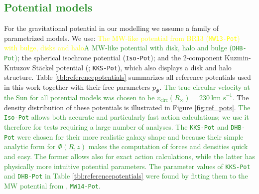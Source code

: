 \documentclass[iop,revtex4,numberedappendix,appendixfloats]{emulateapj}
\newcommand{\NEW}[1]{\textcolor{ForestGreen}{#1}}
\newcommand{\OLD}[1]{\textcolor{Yellow}{#1}}%
\begin{document}
\subsection{\NEW{Potential models}} \label{sec:potentials}

For the gravitational potential in our modelling we assume a family of parametrized models. We use: \OLD{The MW-like potential from BR13 (\texttt{MW13-Pot}) with bulge, disks and halo}\NEW{A MW-like potential with disk, halo and bulge (\texttt{DHB-Pot})}; the spherical isochrone potential (\texttt{Iso-Pot}); and the 2-component Kuzmin-Kutuzov St\"{a}ckel potential (\citealt{1994AA...287...43B}; \texttt{KKS-Pot}), which also displays a disk and halo structure. Table \ref{tbl:referencepotentials} summarizes all reference potentials used in this work together with their free parameters $p_\Phi$. \NEW{The true circular velocity at the Sun for all potential models was chosen to be $v_\text{circ}(R_\odot)=230~\text{km s}^{-1}$.} The density distribution of these potentials is illustrated in Figure \ref{fig:ref_pots}. \NEW{The \texttt{Iso-Pot} allows both accurate and particularly fast action calculations; we use it therefore for tests requiring a large number of analyses. The \texttt{KKS-Pot} and \texttt{DHB-Pot} were chosen for their more realistic galaxy shape and because their simple analytic form for $\Phi(R,z)$ makes the computation of forces and densities quick and easy. The former allows also for exact action calculations, while the latter has physically more intuitive potential parameters. The parameter values of \texttt{KKS-Pot} and \texttt{DHB-Pot} in Table \ref{tbl:referencepotentials} were found by fitting them to the MW potential from \citet{2015ApJS..216...29B}, \texttt{MW14-Pot}.}
\end{document}
